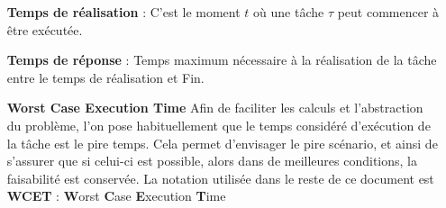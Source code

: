 \documentclass[11pt,a4paper,oneside]{report}
\begin{document}
	\begin{itemize}
		\item[\textbf{Temps de réalisation}] : C'est le moment $t$ où une tâche $\tau$ peut commencer à être exécutée.
		\item[\textbf{Temps de réponse\label{Response Time}}] : Temps maximum nécessaire à la réalisation de la tâche 
		entre le temps de réalisation et Fin.
		\item[\textbf{Worst Case Execution Time}] Afin de faciliter les calculs et l'abstraction du problème, l'on pose habituellement que le temps considéré d'exécution de 
		la tâche est le pire temps. Cela permet d'envisager le pire scénario, et ainsi 
		de s'assurer que si celui-ci est possible, alors dans de meilleures conditions, 
		la faisabilité est conservée. La notation utilisée dans le reste de ce document 
		est  \textbf{WCET} : \textbf{W}orst \textbf{C}ase \textbf{E}xecution \textbf{T}ime
		

\end{itemize}
\end{document}
